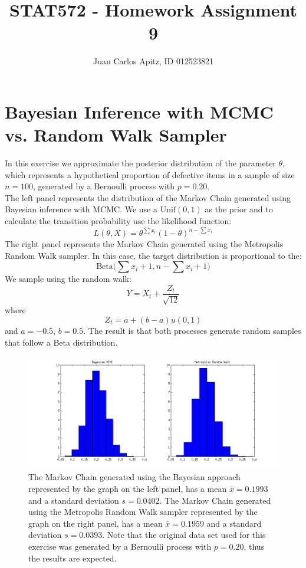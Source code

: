 \documentclass[12pt,a4paper]{article}
\author{Juan Carlos Apitz, ID 012523821}
\title{STAT572 - Homework Assignment 9}
\begin{document}
\maketitle
\clearpage
\section*{Bayesian Inference with MCMC vs. Random Walk Sampler}

In this exercise we approximate the posterior distribution of the parameter $\theta$, which represents a hypothetical proportion of defective items in a sample of size $n=100$, generated by a Bernoulli process with $p=0.20$.\\

The left panel represents the distribution of the Markov Chain generated using Bayesian inference with MCMC. We use a
$\text{Unif}(0,1)$ as the prior and to calculate the transition probability use the likelihood function: \[L(\theta ,X)=\theta^{\sum x_i}(1-\theta)^{n-\sum x_i}\]
The right panel represents the Markov Chain generated using the Metropolis Random Walk sampler. In this case, the target distribution is proportional to the: \[\text{Beta}\bigr(\sum x_i+1,n-\sum x_i+1\bigr)\]
We sample using the random walk:
\[Y=X_t+\dfrac{Z_t}{\sqrt{12}}\] 
where \[Z_t=a+(b-a)u(0,1)\]
and $a=-0.5$, $b=0.5$. The result is that both processes generate random samples that follow a Beta distribution.

\begin{figure}[ht!] 
\begin{center}
\includegraphics[scale=.7]{graph1.png}
\caption{The Markov Chain generated using the Bayesian approach represented by the graph on the left panel, has a mean $\bar{x}= 0.1993$ and a standard deviation $s=0.0402$. The Markov Chain generated using the Metropolis Random Walk sampler represented by the graph on the right panel, has a mean $\bar{x}=0.1959$ and a standard deviation $s=0.0393$. Note that the original data set used for this exercise was generated by a Bernoulli process with $p=0.20$, thus the results are expected.}
\label{inclass fig1}
\end{center}
\end{figure}
\FloatBarrier
\clearpage
\end{document}

